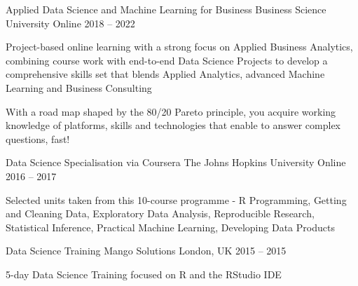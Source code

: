 

\begin{cventries}

  \cventry
    {Applied Data Science and Machine Learning for Business} %
    {Business Science University} %
    {Online} %
    {2018 – 2022} %
    {
      \begin{cvitems} %
        \item {Project-based online learning with a strong focus on Applied Business Analytics, combining course work with end-to-end Data Science Projects to develop a comprehensive skills set that blends Applied Analytics, advanced Machine Learning and Business Consulting}
        \item {With a road map shaped by the 80/20 Pareto principle, you acquire working knowledge of platforms, skills and technologies that enable to answer complex questions, fast!}
      \end{cvitems}
    }

  \cventry
    {Data Science Specialisation via Coursera} %
    {The Johns Hopkins University} %
    {Online} %
    {2016 – 2017} %
    {
      \begin{cvitems} %
        \item {Selected units taken from this 10-course programme - R Programming, Getting and Cleaning Data, Exploratory Data Analysis, Reproducible Research, Statistical Inference, Practical Machine Learning, Developing Data Products}
      \end{cvitems}
    }
    
  \cventry
    {Data Science Training} %
    {Mango Solutions} %
    {London, UK} %
    {2015 – 2015} %
    {
      \begin{cvitems} %
        \item {5-day Data Science Training focused on R and the RStudio IDE}
      \end{cvitems}
    }


\end{cventries}
